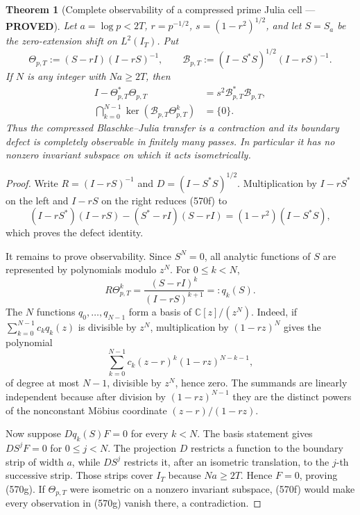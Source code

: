 \documentclass[11pt]{article}
\newtheorem{theorem}{Theorem}
\newcommand{\PROVED}{\textcolor{green!45!black}{\textbf{PROVED}}}
\begin{document}
\begin{theorem}[Complete observability of a compressed prime Julia cell
--- \PROVED]
Let \(a=\log p<2T\), \(r=p^{-1/2}\), \(s=(1-r^2)^{1/2}\), and let
\(S=S_a\) be the zero-extension shift on \(L^2(I_T)\).  Put
\begin{equation}
 \Theta_{p,T}:=(S-rI)(I-rS)^{-1},\qquad
 \mathcal B_{p,T}:=(I-S^*S)^{1/2}(I-rS)^{-1}.        \tag{570e}
\end{equation}
If \(N\) is any integer with \(Na\ge2T\), then
\begin{align}
 I-\Theta_{p,T}^*\Theta_{p,T}
 &=s^2\mathcal B_{p,T}^*\mathcal B_{p,T},            \tag{570f}\\
 \bigcap_{k=0}^{N-1}
 \ker(\mathcal B_{p,T}\Theta_{p,T}^k)&=\{0\}.        \tag{570g}
\end{align}
Thus the compressed Blaschke--Julia transfer is a contraction and its
boundary defect is completely observable in finitely many passes.  In
particular it has no nonzero invariant subspace on which it acts
isometrically.
\end{theorem}

\begin{proof}
Write \(R=(I-rS)^{-1}\) and \(D=(I-S^*S)^{1/2}\).  Multiplication by
\(I-rS^*\) on the left and \(I-rS\) on the right reduces (570f) to
\[
 (I-rS^*)(I-rS)-(S^*-rI)(S-rI)
 =(1-r^2)(I-S^*S),
\]
which proves the defect identity.

It remains to prove observability.  Since \(S^N=0\), all analytic functions
of \(S\) are represented by polynomials modulo \(z^N\).  For
\(0\le k<N\),
\[
 R\Theta_{p,T}^k
 =\frac{(S-rI)^k}{(I-rS)^{k+1}}=:q_k(S).
\]
The \(N\) functions \(q_0,\ldots,q_{N-1}\) form a basis of
\(\mathbb C[z]/(z^N)\).  Indeed, if
\(\sum_{k=0}^{N-1}c_kq_k(z)\) is divisible by \(z^N\), multiplication by
\((1-rz)^N\) gives the polynomial
\[
 \sum_{k=0}^{N-1}c_k(z-r)^k(1-rz)^{N-k-1},
\]
of degree at most \(N-1\), divisible by \(z^N\), hence zero.  The summands
are linearly independent because after division by
\((1-rz)^{N-1}\) they are the distinct powers of the nonconstant M\"obius
coordinate \((z-r)/(1-rz)\).

Now suppose \(Dq_k(S)F=0\) for every \(k<N\).  The basis statement gives
\(DS^jF=0\) for \(0\le j<N\).  The projection \(D\) restricts a function to
the boundary strip of width \(a\), while \(DS^j\) restricts it, after an
isometric translation, to the \(j\)-th successive strip.  Those strips
cover \(I_T\) because \(Na\ge2T\).  Hence \(F=0\), proving (570g).
If \(\Theta_{p,T}\) were isometric on a nonzero invariant subspace, (570f)
would make every observation in (570g) vanish there, a contradiction.
\end{proof}
\end{document}
